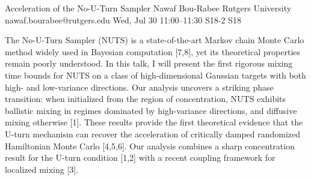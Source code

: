 \begin{talk}
  {Acceleration of the No-U-Turn Sampler}%
  {Nawaf Bou-Rabee}%
  {Rutgers University}%
  {nawaf.bourabee@rutgers.edu}%
  {}%
  {}%
  {Wed, Jul 30 11:00--11:30}%
  {S18-2}%
  {S18}%
  {}%
  
    
   

\medskip

The No-U-Turn Sampler (NUTS) is a state-of-the-art Markov chain Monte Carlo method widely used in Bayesian computation [7,8], yet its theoretical properties remain poorly understood. In this talk, I will present the first rigorous mixing time bounds for NUTS on a class of high-dimensional Gaussian targets with both high- and low-variance directions. Our analysis uncovers a striking phase transition: when initialized from the region of concentration, NUTS exhibits ballistic mixing in regimes dominated by high-variance directions, and diffusive mixing otherwise [1]. These results provide the first theoretical evidence that the U-turn mechanism can recover the acceleration of critically damped randomized Hamiltonian Monte Carlo [4,5,6].  Our analysis combines a sharp concentration result for the U-turn condition [1,2] with a recent coupling framework for localized mixing [3]. 


\end{talk}
